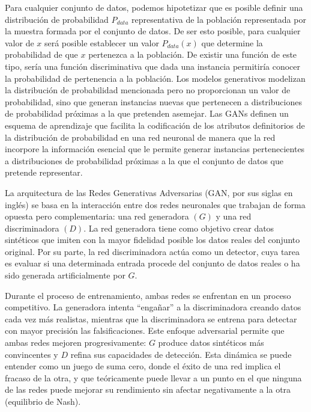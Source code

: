 \documentclass[a4paper,10pt,spanish]{jupyterBook}
\begin{document}
\sphinxAtStartPar
Para cualquier conjunto de datos, podemos hipotetizar que es posible definir una distribución de probabilidad \(P_{data}\) representativa de la población representada por la muestra formada por el conjunto de datos. De ser esto posible, para cualquier valor de \(x\) será posible establecer un valor \(P_{data}(x)\) que determine la probabilidad de que \(x\) pertenezca a la población. De existir una función de este tipo, sería una función discriminativa que dada una instancia permitiría conocer la probabilidad de pertenencia a la población. Los modelos generativos modelizan la distribución de probabilidad mencionada pero no proporcionan un valor de probabilidad, sino que generan instancias nuevas que pertenecen a distribuciones de probabilidad próximas a la que pretenden asemejar. Las GANs definen un esquema de aprendizaje que facilita la codificación de los atributos definitorios de la distribución de probabilidad en una red neuronal de manera que la red incorpore la información esencial que le permite generar instancias pertenecientes a distribuciones de probabilidad próximas a la que el conjunto de datos que pretende representar.

\sphinxAtStartPar
La arquitectura de las Redes Generativas Adversarias (GAN, por sus siglas en inglés) se basa en la interacción entre dos redes neuronales que trabajan de forma opuesta pero complementaria: una red generadora \((G)\) y una red discriminadora \((D)\). La red generadora tiene como objetivo crear datos sintéticos que imiten con la mayor fidelidad posible los datos reales del conjunto original. Por su parte, la red discriminadora actúa como un detector, cuya tarea es evaluar si una determinada entrada procede del conjunto de datos reales o ha sido generada artificialmente por \(G\).

\sphinxAtStartPar
Durante el proceso de entrenamiento, ambas redes se enfrentan en un proceso competitivo. La generadora intenta “engañar” a la discriminadora creando datos cada vez más realistas, mientras que la discriminadora se entrena para detectar con mayor precisión las falsificaciones. Este enfoque adversarial permite que ambas redes mejoren progresivamente: \(G\) produce datos sintéticos más convincentes y \(D\) refina sus capacidades de detección. Esta dinámica se puede entender como un juego de suma cero, donde el éxito de una red implica el fracaso de la otra, y que teóricamente puede llevar a un punto en el que ninguna de las redes puede mejorar su rendimiento sin afectar negativamente a la otra (equilibrio de Nash).
\end{document}

